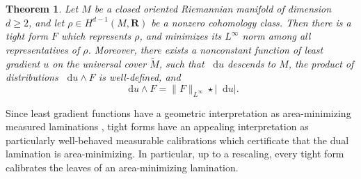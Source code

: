 \documentclass[reqno,11pt]{amsart}
\newcommand{\RR}{\mathbf{R}}
\newcommand*\dif{\mathop{}\!\mathrm{d}}
\newtheorem{theorem}{Theorem}[section]
\theoremstyle{definition}
\numberwithin{equation}{section}
\begin{document}
\begin{theorem}\label{existence of infinity tight forms}
Let $M$ be a closed oriented Riemannian manifold of dimension $d \geq 2$, and let $\rho \in H^{d - 1}(M, \RR)$ be a nonzero cohomology class.
Then there is a tight form $F$ which represents $\rho$, and minimizes its $L^\infty$ norm among all representatives of $\rho$.
Moreover, there exists a nonconstant function of least gradient $u$ on the universal cover $\tilde M$, such that $\dif u$ descends to $M$, the product of distributions $\dif u \wedge F$ is well-defined, and
\begin{equation}\label{max flow min cut}
\dif u \wedge F = \|F\|_{L^\infty} \star |\dif u|.
\end{equation}
\end{theorem}

Since least gradient functions have a geometric interpretation as area-minimizing measured laminations \cite{BackusCML}, tight forms have an appealing interpretation as particularly well-behaved measurable calibrations which certificate that the dual lamination is area-minimizing.
In particular, up to a rescaling, every tight form calibrates the leaves of an area-minimizing lamination.



\end{document}
